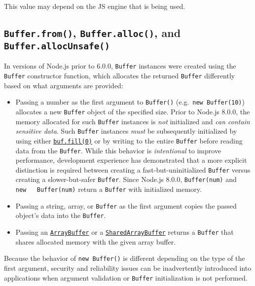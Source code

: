 This value may depend on the JS engine that is being used.

\subsection{\texorpdfstring{\texttt{Buffer.from()},
\texttt{Buffer.alloc()}, and
\texttt{Buffer.allocUnsafe()}}{Buffer.from(), Buffer.alloc(), and Buffer.allocUnsafe()}}\label{buffer.from-buffer.alloc-and-buffer.allocunsafe}

In versions of Node.js prior to 6.0.0, \texttt{Buffer} instances were
created using the \texttt{Buffer} constructor function, which allocates
the returned \texttt{Buffer} differently based on what arguments are
provided:

\begin{itemize}
\tightlist
\item
  Passing a number as the first argument to \texttt{Buffer()}
  (e.g.~\texttt{new\ Buffer(10)}) allocates a new \texttt{Buffer} object
  of the specified size. Prior to Node.js 8.0.0, the memory allocated
  for such \texttt{Buffer} instances is \emph{not} initialized and
  \emph{can contain sensitive data}. Such \texttt{Buffer} instances
  \emph{must} be subsequently initialized by using either
  \hyperref[buffillvalue-offset-end-encoding]{\texttt{buf.fill(0)}} or
  by writing to the entire \texttt{Buffer} before reading data from the
  \texttt{Buffer}. While this behavior is \emph{intentional} to improve
  performance, development experience has demonstrated that a more
  explicit distinction is required between creating a
  fast-but-uninitialized \texttt{Buffer} versus creating a
  slower-but-safer \texttt{Buffer}. Since Node.js 8.0.0,
  \texttt{Buffer(num)} and \texttt{new\ \ \ Buffer(num)} return a
  \texttt{Buffer} with initialized memory.
\item
  Passing a string, array, or \texttt{Buffer} as the first argument
  copies the passed object's data into the \texttt{Buffer}.
\item
  Passing an
  \href{https://developer.mozilla.org/en-US/docs/Web/JavaScript/Reference/Global_Objects/ArrayBuffer}{\texttt{ArrayBuffer}}
  or a
  \href{https://developer.mozilla.org/en-US/docs/Web/JavaScript/Reference/Global_Objects/SharedArrayBuffer}{\texttt{SharedArrayBuffer}}
  returns a \texttt{Buffer} that shares allocated memory with the given
  array buffer.
\end{itemize}

Because the behavior of \texttt{new\ Buffer()} is different depending on
the type of the first argument, security and reliability issues can be
inadvertently introduced into applications when argument validation or
\texttt{Buffer} initialization is not performed.

